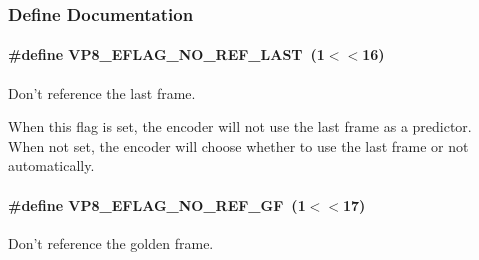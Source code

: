 \subsubsection{\-Define \-Documentation}
\hypertarget{group__vp8__encoder_gafb51c67e5743275146bc1fc425727da3}{
\paragraph[{\-V\-P8\-\_\-\-E\-F\-L\-A\-G\-\_\-\-N\-O\-\_\-\-R\-E\-F\-\_\-\-L\-A\-S\-T}]{\setlength{\rightskip}{0pt plus 5cm}\#define \-V\-P8\-\_\-\-E\-F\-L\-A\-G\-\_\-\-N\-O\-\_\-\-R\-E\-F\-\_\-\-L\-A\-S\-T~(1$<$$<$16)}}
\label{group__vp8__encoder_gafb51c67e5743275146bc1fc425727da3}


\-Don't reference the last frame. 

\-When this flag is set, the encoder will not use the last frame as a predictor. \-When not set, the encoder will choose whether to use the last frame or not automatically. \hypertarget{group__vp8__encoder_gabb5e95343a2738abef44eca13059da33}{
\paragraph[{\-V\-P8\-\_\-\-E\-F\-L\-A\-G\-\_\-\-N\-O\-\_\-\-R\-E\-F\-\_\-\-G\-F}]{\setlength{\rightskip}{0pt plus 5cm}\#define \-V\-P8\-\_\-\-E\-F\-L\-A\-G\-\_\-\-N\-O\-\_\-\-R\-E\-F\-\_\-\-G\-F~(1$<$$<$17)}}
\label{group__vp8__encoder_gabb5e95343a2738abef44eca13059da33}


\-Don't reference the golden frame. 

